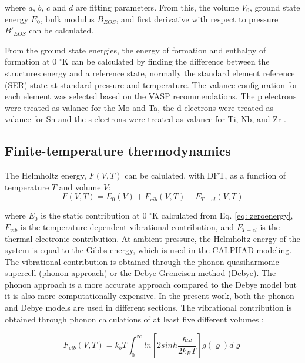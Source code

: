 \noindent where $a$, $b$, $c$ and $d$ are fitting parameters. From this, the volume $V_0$, ground state energy $E_{0}$, bulk modulus $B_{EOS}$, and first derivative with respect to pressure $B'_{EOS}$ can be calculated. 

From the ground state energies, the energy of formation and enthalpy of formation at 0 $^\circ$K can be calculated by finding the difference between the structures energy and a reference state, normally the standard element reference (SER) state at standard pressure and temperature. The valance configuration for each element was selected based on the VASP recommendations. The p electrons were treated as valance for the Mo and Ta, the d electrons were treated as valance for Sn and the s electrons were treated as valance for Ti, Nb, and Zr \cite{Kresse1996,Kresse1999}.

\subsection{Finite-temperature thermodynamics}

The Helmholtz energy, $F(V,T)$ can be calulated, with DFT, as a function of temperature $T$ and volume $V$:
 \begin{equation}
 \label{eq: helmholtz}
 F(V,T) = E_{0}(V) + F_{vib}(V,T) + F_{T-el}(V,T)
 \end{equation}
 
\noindent where $E_0$ is the static contribution at 0 $^\circ$K calculated from Eq. \ref{eq: zeroenergy}, $F_{vib}$ is the temperature-dependent vibrational contribution, and $F_{T-el}$ is the thermal electronic contribution. At ambient pressure, the Helmholtz energy of the system is equal to the Gibbs energy, which is used in the CALPHAD modeling. The vibrational contribution is obtained through the phonon quasiharmonic supercell (phonon approach) or the Debye-Gr$\ddot{u}$neisen method (Debye). The phonon approach is a more accurate approach compared to the Debye model but it is also more computationally expensive. In the present work, both the phonon and Debye models are used in different sections. The vibrational contribution is obtained through phonon calculations of at least five different volumes \cite{Wang2012}:

\begin{equation}
\label{eq: phonon}
F_{vib}(V,T) = k_{b}T \int_{0}^{\infty} ln \left[ 2sinh \frac{\hbar \omega}{2k_BT} \right] g(\varrho) d\varrho
\end{equation}

